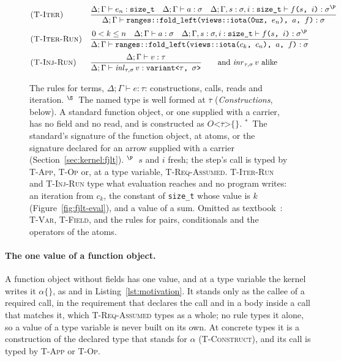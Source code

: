 \begin{figure}[htbp]
\[\begin{array}{@{}l@{\quad}l@{}}
\\[18pt]
\textsc{(T-Iter)} & \dfrac{\Delta; \Gamma \vdash e_n : \texttt{size\_t} \quad \Delta; \Gamma \vdash a : \sigma \quad \Delta; \Gamma, s : \sigma, i : \texttt{size\_t} \vdash f\texttt{(}s\texttt{, }i\texttt{)} : \sigma^{\P}}{\Delta; \Gamma \vdash \texttt{ranges::fold\_left(views::iota(0uz, }e_n\texttt{), }a\texttt{, }f\texttt{)} : \sigma}
\\[12pt]
\textsc{(T-Iter-Run)} & \dfrac{0 < k \le n \quad \Delta; \Gamma \vdash a : \sigma \quad \Delta; \Gamma, s : \sigma, i : \texttt{size\_t} \vdash f\texttt{(}s\texttt{, }i\texttt{)} : \sigma^{\P}}{\Delta; \Gamma \vdash \texttt{ranges::fold\_left(views::iota(}c_k\texttt{, }c_n\texttt{), }a\texttt{, }f\texttt{)} : \sigma}
\\[12pt]
\textsc{(T-Inj-Run)} & \dfrac{\Delta; \Gamma \vdash v : \tau}{\Delta; \Gamma \vdash \mathit{inl}_{\tau, \sigma}\,v : \texttt{variant<}\tau\texttt{, }\sigma\texttt{>}} \qquad \text{and } \mathit{inr}_{\tau, \sigma}\,v \text{ alike}
\end{array}
\]
\caption{The rules for terms, $\Delta; \Gamma \vdash e : \tau$: constructions, calls, reads and iteration.
$^{\S}$~The named type is well formed at $\overline{\tau}$ (\emph{Constructions}, below).
A standard function object, or one supplied with a carrier, has no field and no read, and is constructed as $O\texttt{<}\overline{\tau}\texttt{>\{\}}$.
$^{\ast}$~The standard's signature of the function object, at atoms, or the signature declared for an arrow supplied with a carrier (Section~\ref{sec:kernel:fjlt}).
$^{\P}$~$s$ and $i$ fresh; the step's call is typed by \textsc{T-App}, \textsc{T-Op} or, at a type variable, \textsc{T-Req-Assumed}.
\textsc{T-Iter-Run} and \textsc{T-Inj-Run} type what evaluation reaches and no program writes: an iteration from $c_k$, the constant of \texttt{size\_t} whose value is $k$ (Figure~\ref{fig:fjlt-eval}), and a value of a sum.
Omitted as textbook~\cite[Chapters~8, 9 and~11]{pierce2002tapl}: \textsc{T-Var}, \textsc{T-Field}, and the rules for pairs, conditionals and the operators of the atoms.}
\label{fig:fjlt-typing}
\end{figure}

\paragraph{The one value of a function object.}
A function object without fields has one value, and at a type variable the kernel writes it $\alpha\texttt{\{\}}$, as  and  in Listing~\ref{lst:motivation}.
It stands only as the callee of a required call, in the requirement that declares the call and in a body inside a call that matches it, which \textsc{T-Req-Assumed} types as a whole; no rule types it alone, so a value of a type variable is never built on its own.
At concrete types it is a construction of the declared type that stands for $\alpha$ (\textsc{T-Construct}), and its call is typed by \textsc{T-App} or \textsc{T-Op}.


